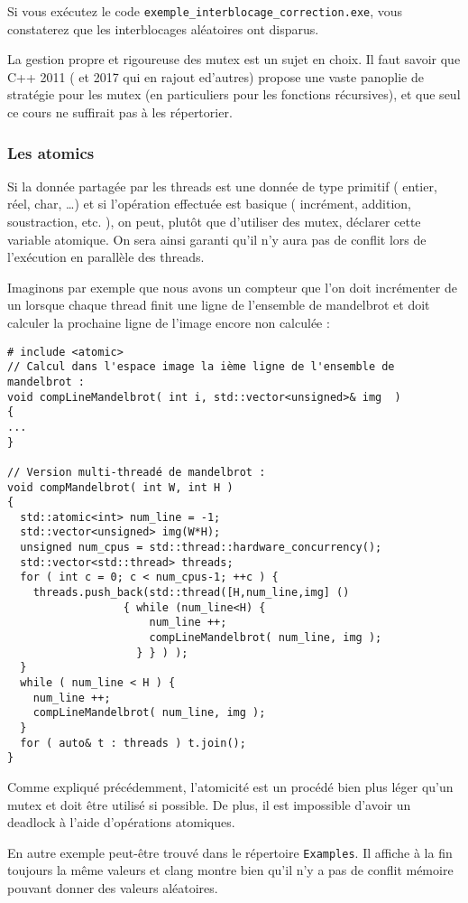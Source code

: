 \documentclass[fleqn,11pt]{article}
\begin{document}
Si vous exécutez le code \texttt{exemple\_interblocage\_correction.exe}, vous constaterez que les
interblocages aléatoires ont disparus. 

La gestion propre et rigoureuse des mutex est un sujet en choix. Il faut savoir que C++ 2011 ( et 2017
qui en rajout ed'autres) propose une vaste panoplie de stratégie pour les mutex (en particuliers pour les fonctions récursives), et que seul ce cours ne suffirait pas à les répertorier.

\subsubsection{Les atomics}

Si la donnée partagée par les threads est une donnée de type primitif ( entier, réel, char, \ldots ) et si l'opération effectuée est basique ( incrément, addition, soustraction, etc. ), on peut, plutôt que d'utiliser des mutex, déclarer cette variable atomique. On sera ainsi garanti qu'il n'y aura pas de conflit lors de l'exécution en parallèle des threads.

Imaginons par exemple que nous avons un compteur que l'on doit incrémenter de un lorsque chaque thread finit une ligne de l'ensemble de mandelbrot et doit calculer la prochaine ligne de l'image encore non calculée :

\begin{lstlisting}
# include <atomic>
// Calcul dans l'espace image la ième ligne de l'ensemble de mandelbrot :
void compLineMandelbrot( int i, std::vector<unsigned>& img  )
{
...
}

// Version multi-threadé de mandelbrot :
void compMandelbrot( int W, int H )
{
  std::atomic<int> num_line = -1;
  std::vector<unsigned> img(W*H);
  unsigned num_cpus = std::thread::hardware_concurrency();
  std::vector<std::thread> threads;
  for ( int c = 0; c < num_cpus-1; ++c ) {
    threads.push_back(std::thread([H,num_line,img] () 
				  { while (num_line<H) { 
				      num_line ++;
				      compLineMandelbrot( num_line, img );
				    } } ) );
  }
  while ( num_line < H ) {
    num_line ++;
    compLineMandelbrot( num_line, img );
  }
  for ( auto& t : threads ) t.join();
}
\end{lstlisting}

Comme expliqué précédemment, l'atomicité est un procédé bien plus léger qu'un mutex et doit être utilisé si possible. De plus, il est impossible d'avoir un deadlock à l'aide d'opérations atomiques.

En autre exemple peut-être trouvé dans le répertoire \texttt{Examples}. Il affiche à la fin toujours la même
valeurs et clang montre bien qu'il n'y a pas de conflit mémoire pouvant donner des valeurs aléatoires.
\end{document}
